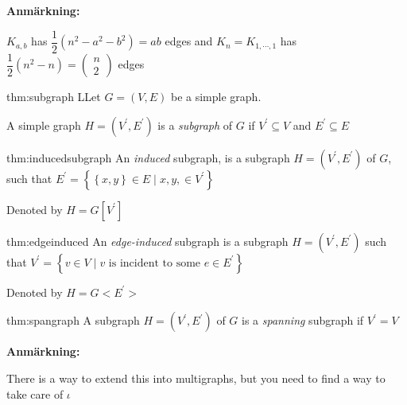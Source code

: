 \par\bigskip
\noindent\textbf{Anmärkning:}\par
\noindent $K_{a,b}$ has $\dfrac{1}{2}(n^2-a^2-b^2) = ab$ edges and $K_n = K_{1,\cdots,1}$ has $\dfrac{1}{2}(n^2-n) = \begin{pmatrix}n\\2\end{pmatrix}$ edges
\par\bigskip
\begin{theo}[Subgraph]{thm:subgraph}
  LLet $G = (V,E)$ be a simple graph.\par
  \noindent A simple graph $H = (V^{\prime}, E^{\prime})$ is a \textit{subgraph} of $G$ if $V^{\prime}\subseteq V$ and $E^{\prime}\subseteq E$
\end{theo}
\par\bigskip
\begin{theo}{thm:inducedsubgraph}
  An \textit{induced} subgraph, is a subgraph $H = (V^{\prime}, E^{\prime})$ of $G$, such that $E^{\prime} = \left\{\left\{x,y\right\}\in E\;|\; x,y,\in V^{\prime}\right\}$
  \par\bigskip
  \noindent Denoted by $H = G[V^{\prime}]$
\end{theo}
\par\bigskip
\begin{theo}{thm:edgeinduced}
  An \textit{edge-induced} subgraph is a subgraph $H = (V^{\prime}, E^{\prime})$ such that $V^{\prime} = \left\{v \in V\;|\; v\text{ is incident to some } e\in E^{\prime}\right\}$
  \par\bigskip
  \noindent Denoted by $H = G<E^{\prime}>$
\end{theo}
\par\bigskip
\begin{theo}{thm:spangraph}
  A subgraph $H = (V^{\prime}, E^{\prime})$ of $G$ is a \textit{spanning} subgraph if $V^{\prime} = V$
\end{theo}
\par\bigskip
\noindent\textbf{Anmärkning:}\par
\noindent There is a way to extend this into multigraphs, but you need to find a way to take care of $\iota$ 
